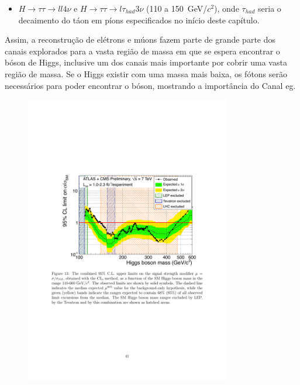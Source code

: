 \begin{itemize} 
\item $H\rightarrow \tau \tau \rightarrow ll4\nu$ e $H\rightarrow \tau \tau
\rightarrow l\tau_{had}3\nu$ (110 a 150~GeV/$c^2$), onde $\tau_{had}$ seria o
decaimento do táon em píons especificados no início deste capítulo.
\end{itemize} 

Assim, a reconstrução de elétrons e múons fazem parte de grande
parte dos canais explorados para a vasta região de massa em que se espera
encontrar o bóson de Higgs, inclusive um dos canais
mais importante por cobrir uma vasta região de massa. Se o Higgs existir com
uma massa mais baixa, os fótons serão necessários para poder encontrar o bóson,
mostrando a importância do Canal \gls{eg}. 

\begin{figure}[t!]
    \label{fig:higgs_exclusion}
    \begin{center}
    \includegraphics[width=0.8\textwidth]{imagens/exclusion_cms_atlas.pdf}
%

\end{center}
\end{figure}
